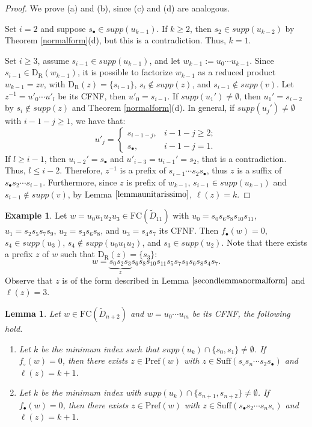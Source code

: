 \documentclass{amsart}
\newcommand{\D}{{\widetilde{D}_{n+2}}}
\newcommand{\rd}{{\mathrm{D}_{\mathrm{R}}}}
\newcommand{\fc}{{\mathrm{FC}}}
\newcommand{\s}{{s_{\bullet}}}
\newcommand{\sn}{{s_\circ}}
\newcommand{\su}{\mathrm{Suff}}
\newcommand{\pr}{\mathrm{Pref}}
\newtheorem{Lemma}[Theorem]{Lemma}
\theoremstyle{definition}
\newtheorem{Example}[Theorem]{Example}
\begin{document}
\begin{proof}
We prove (a) and (b), since (c) and (d) are analogous. 

Set $i=2$ and suppose $\s \in supp(u_{k-1})$. If $k\ge 2$, then $s_2\in supp(u_{k-2})$ by Theorem \ref{normalform}(d), but this is a contradiction. Thus, $k=1$.
 
Set $i\ge 3$, assume $s_{i-1}\in supp(u_{k-1})$, and let $w_{k-1}:=u_0\cdots u_{k-1}$. Since $s_{i-1}\in \rd(w_{k-1})$, it is possible to factorize $w_{k-1}$ as a reduced product $w_{k-1}=zv$, with $\rd(z)=\{s_{i-1}\}$, $s_{i}\notin supp(z)$, and $s_{i-1}\notin supp(v)$. Let $z^{-1}=u'_0\cdots u'_l$ be its CFNF, then $u'_0=s_{i-1}$. If $supp(u_1')\ne \emptyset$, then $u_1'=s_{i-2}$ by $s_i\notin supp(z)$ and Theorem \ref{normalform}(d). In general, if $supp(u_{j}')\ne \emptyset$ with $i-1-j\ge 1$, we have that: 
    \[u'_j=\begin{cases}
    s_{i-1-j}, & i-1-j\ge 2; \\ \s, & i-1-j=1.
    \end{cases}\] 
    If $l\ge i-1$, then $u_{i-2}'=\s$ and $u'_{i-3}=u_{i-1}'=s_2$, that is a contradiction. Thus, $l\le i-2$. Therefore, $z^{-1}$ is a prefix of $s_{i-1}\cdots s_2\s$, thus $z$ is a suffix of $\s s_2 \cdots s_{i-1}$. Furthermore, since $z$ is prefix of $w_{k-1}$, $s_{i-1}\in supp(u_{k-1})$ and $s_{i-1}\notin supp(v)$, by Lemma $\ref{lemmaunitarissimo}$, $\ell(z)=k$.
 
\end{proof}

\begin{Example}
\label{exseclemmanf}
Let $w=u_0u_1u_2u_3\in \fc(\widetilde{D}_{11})$ with $u_0=s_0s_6s_8s_{10}s_{11}$, $u_{1}=s_2s_5s_7s_9$, $u_2=s_3s_6s_8$, and $u_3=s_4s_7$ its CFNF. Then $f_\bullet(w)=0$, $s_4\in supp(u_3)$, $s_4\notin supp(u_{0}u_1u_2)$, and $s_3\in supp(u_2)$. Note that there exists a prefix $z$ of $w$ such that $\rd(z)=\{s_3\}$: \[w=\underbrace{s_0s_2s_3}_{z}s_6s_8s_{10}s_{11}s_5s_7s_9s_6s_8s_4s_7.\] Observe that $z$ is of the form described in Lemma $\ref{secondlemmanormalform}$ and $\ell(z)=3$. 
\end{Example}

\begin{Lemma}
\label{cornormalform}
Let $w\in \fc(\D)$ and $w=u_0\cdots u_m$ be its CFNF, the following hold.
\begin{enumerate}
    \item[(a)] Let $k$ be the minimum index such that $supp(u_k)\cap \{s_0,s_1\}\ne \emptyset$. If $f_\circ(w)=0$, then there exists $z\in \pr(w)$ with $z\in \su (\sn s_n\cdots s_2\s)$ and $\ell(z)=k+1$.
    \item[(b)] Let $k$ be the minimum index with $supp(u_k)\cap \{s_{n+1},s_{n+2}\}\ne \emptyset$. If $f_\bullet(w)=0$, then there exists $z\in \pr(w)$ with $z\in \su(\s s_2\cdots s_n\sn)$ and $\ell(z)=k+1$.
\end{enumerate}
\end{Lemma}
\end{document}
